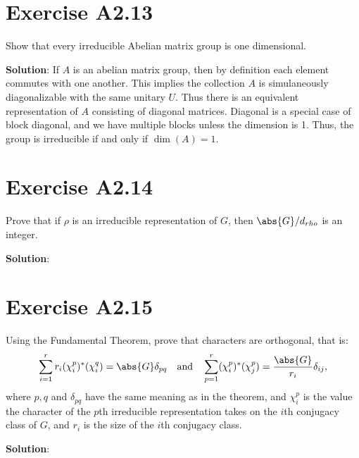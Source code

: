 \documentclass{book}
\begin{document}
\section*{Exercise A2.13}
    Show that every irreducible Abelian matrix group is one dimensional.
    
    \textbf{Solution}: If $A$ is an abelian matrix group, then by definition each element commutes with one another. This implies the collection $A$ is simulaneously diagonalizable with the same unitary $U$. Thus there is an equivalent representation of $A$ consisting of diagonal matrices. Diagonal is a special case of block diagonal, and we have multiple blocks unless the dimension is 1. Thus, the group is irreducible if and only if $\dim(A) = 1$.

\section*{Exercise A2.14}
    Prove that if $\rho$ is an irreducible representation of $G$, then $\abs{G}/d_{rho}$ is an integer.
    
    \textbf{Solution}:

\section*{Exercise A2.15}
    Using the Fundamental Theorem, prove that characters are orthogonal, that is:
    \begin{align}
        \sum_{i=1}^r r_i(\chi_i^p)^*(\chi_i^q) = \abs{G}\delta_{pq} \quad \text{and} \quad \sum_{p=1}^r (\chi_i^p)^*(\chi_j^p) = \frac{\abs{G}}{r_i} \delta_{ij},
    \end{align}
    where $p, q$ and $\delta_{pq}$ have the same meaning as in the theorem, and $\chi_i^p$ is the value the character of the $p$th irreducible representation takes on the $i$th conjugacy class of $G$, and $r_i$ is the size of the $i$th conjugacy class.
    
    \textbf{Solution}:
\end{document}
